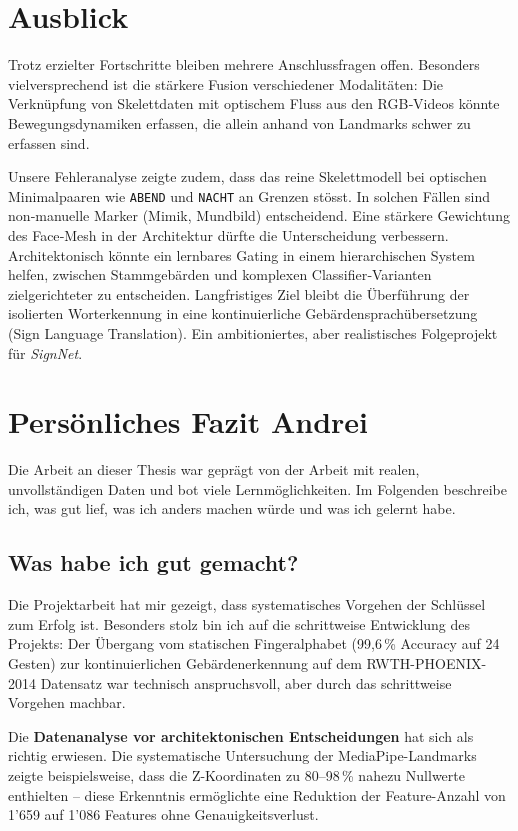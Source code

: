 \section{Ausblick}
Trotz erzielter Fortschritte bleiben mehrere Anschlussfragen offen. Besonders vielversprechend ist die stärkere Fusion verschiedener Modalitäten: Die Verknüpfung von Skelettdaten mit optischem Fluss aus den RGB‑Videos könnte Bewegungsdynamiken erfassen, die allein anhand von Landmarks schwer zu erfassen sind.

Unsere Fehleranalyse zeigte zudem, dass das reine Skelettmodell bei optischen Minimalpaaren wie \texttt{ABEND} und \texttt{NACHT} an Grenzen stösst. In solchen Fällen sind non‑manuelle Marker (Mimik, Mundbild) entscheidend. Eine stärkere Gewichtung des Face‑Mesh in der Architektur dürfte die Unterscheidung verbessern. Architektonisch könnte ein lernbares Gating in einem hierarchischen System helfen, zwischen Stammgebärden und komplexen Classifier‑Varianten zielgerichteter zu entscheiden. Langfristiges Ziel bleibt die Überführung der isolierten Worterkennung in eine kontinuierliche Gebärdensprachübersetzung (Sign Language Translation). Ein ambitioniertes, aber realistisches Folgeprojekt für \textit{SignNet}.

\section{Persönliches Fazit Andrei}
\label{sec:personal_conclusion_andrei}
Die Arbeit an dieser Thesis war geprägt von der Arbeit mit realen, unvollständigen Daten und bot viele Lernmöglichkeiten. Im Folgenden beschreibe ich, was gut lief, was ich anders machen würde und was ich gelernt habe.

\subsection{Was habe ich gut gemacht?}
Die Projektarbeit hat mir gezeigt, dass systematisches Vorgehen der Schlüssel zum Erfolg ist. Besonders stolz bin ich auf die schrittweise Entwicklung des Projekts: Der Übergang vom statischen Fingeralphabet (99,6\,\% Accuracy auf 24 Gesten) zur kontinuierlichen Gebärdenerkennung auf dem RWTH-PHOENIX-2014 Datensatz war technisch anspruchsvoll, aber durch das schrittweise Vorgehen machbar.

Die \textbf{Datenanalyse vor architektonischen Entscheidungen} hat sich als richtig erwiesen. Die systematische Untersuchung der MediaPipe-Landmarks zeigte beispielsweise, dass die Z-Koordinaten zu 80--98\,\% nahezu Nullwerte enthielten -- diese Erkenntnis ermöglichte eine Reduktion der Feature-Anzahl von 1'659 auf 1'086 Features ohne Genauigkeitsverlust.

